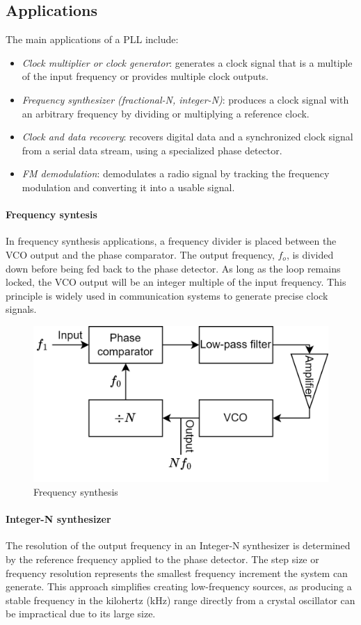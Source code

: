 \subsection{Applications}
The main applications of a PLL include:
\begin{itemize}
    \item \textit{Clock multiplier or clock generator}: generates a clock signal that is a multiple of the input frequency or provides multiple clock outputs.
    \item \textit{Frequency synthesizer (fractional-N, integer-N)}: produces a clock signal with an arbitrary frequency by dividing or multiplying a reference clock.
    \item \textit{Clock and data recovery}: recovers digital data and a synchronized clock signal from a serial data stream, using a specialized phase detector.
    \item \textit{FM demodulation}: demodulates a radio signal by tracking the frequency modulation and converting it into a usable signal.
\end{itemize}

\paragraph*{Frequency syntesis}
In frequency synthesis applications, a frequency divider is placed between the VCO output and the phase comparator. 
The output frequency, $f_{{o}}$, is divided down before being fed back to the phase detector. 
As long as the loop remains locked, the VCO output will be an integer multiple of the input frequency. 
This principle is widely used in communication systems to generate precise clock signals.
\begin{figure}[H]
    \centering
    \includegraphics[width=0.65\linewidth]{images/freq.png}
    \caption{Frequency synthesis}
\end{figure}

\paragraph*{Integer-N synthesizer}
The resolution of the output frequency in an Integer-N synthesizer is determined by the reference frequency applied to the phase detector. 
The step size or frequency resolution represents the smallest frequency increment the system can generate. 
This approach simplifies creating low-frequency sources, as producing a stable frequency in the kilohertz (kHz) range directly from a crystal oscillator can be impractical due to its large size.

